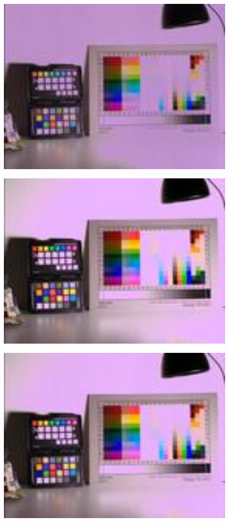 \begin{center}
\includegraphics[height=9cm]{images/100ms-1ms-00-tiny}
\end{center}

\begin{center}
\includegraphics[height=9cm]{images/100ms-1ms-0-tiny}
\end{center}

\begin{center}
\includegraphics[height=9cm]{images/100ms-1ms-8-tiny}
\end{center}

